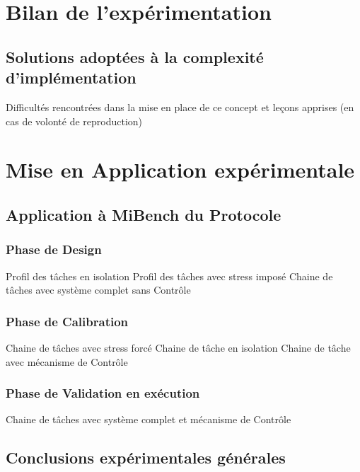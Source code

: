 \documentclass[a4paper,11pt,twoside]{StyleThese}
\begin{document}
\setcounter{chapter}{6} %
\dominitoc
\faketableofcontents
\fi

\chapter{Bilan de l'expérimentation}
\minitoc

    \section{Solutions adoptées à la complexité d'implémentation}
        Difficultés rencontrées dans la mise en place de ce concept et leçons apprises (en cas de volonté de reproduction)
      
\chapter{Mise en Application expérimentale}
    \section{Application à MiBench du Protocole}
        \subsection{Phase de Design}
            Profil des tâches en isolation
            Profil des tâches avec stress imposé
            Chaine de tâches avec système complet sans Contrôle
        \subsection{Phase de Calibration}
            Chaine de tâches avec stress forcé
            Chaine de tâche en isolation
            Chaine de tâche avec mécanisme de Contrôle
        \subsection{Phase de Validation en exécution}
            Chaine de tâches avec système complet et mécanisme de Contrôle
    \section{Conclusions expérimentales générales}  
\ifdefined{}
\else


\end{document}
